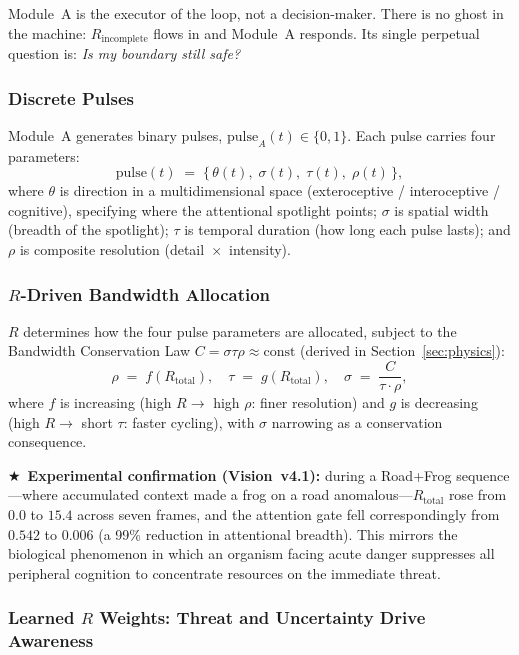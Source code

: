 \documentclass[12pt,a4paper]{article}
\newcommand{\Rtot}{R_{\mathrm{total}}}
\newcommand{\starred}{\textbf{\textcolor{pbtblue}{$\bigstar$}}~}
\begin{document}
Module~A is the executor of the loop, not a decision-maker. There is no ghost
in the machine: $R_{\mathrm{incomplete}}$ flows in and Module~A responds. Its
single perpetual question is: \emph{Is my boundary still safe?}

\subsubsection{Discrete Pulses}

Module~A generates binary pulses, $\mathrm{pulse}_A(t)\in\{0,1\}$.
Each pulse carries four parameters:
\begin{equation}
  \mathrm{pulse}(t) \;=\; \bigl\{\,\theta(t),\;\sigma(t),\;\tau(t),\;\rho(t)\,\bigr\},
\end{equation}
where $\theta$ is direction in a multidimensional space
(exteroceptive / interoceptive / cognitive), specifying where the attentional
spotlight points; $\sigma$ is spatial width (breadth of the spotlight);
$\tau$ is temporal duration (how long each pulse lasts); and $\rho$ is
composite resolution (detail~$\times$~intensity).

\subsubsection{$R$-Driven Bandwidth Allocation}

$R$ determines how the four pulse parameters are allocated, subject to the
Bandwidth Conservation Law $C = \sigma\tau\rho\approx\mathrm{const}$
(derived in Section~\ref{sec:physics}):
\begin{equation}
  \rho \;=\; f(\Rtot),\quad
  \tau \;=\; g(\Rtot),\quad
  \sigma \;=\; \frac{C}{\tau\cdot\rho},
  \label{eq:bandwidth_alloc}
\end{equation}
where $f$ is increasing (high $R \to$ high $\rho$: finer resolution) and $g$
is decreasing (high $R \to$ short $\tau$: faster cycling), with $\sigma$
narrowing as a conservation consequence.

\starred\textbf{Experimental confirmation (Vision~v4.1):} during a Road+Frog
sequence---where accumulated context made a frog on a road anomalous---$\Rtot$
rose from $0.0$ to $15.4$ across seven frames, and the attention gate fell
correspondingly from $0.542$ to $0.006$ (a 99\% reduction in attentional
breadth). This mirrors the biological phenomenon in which an organism facing
acute danger suppresses all peripheral cognition to concentrate resources on
the immediate threat.

\subsubsection{Learned $R$ Weights: Threat and Uncertainty Drive Awareness}
\end{document}
